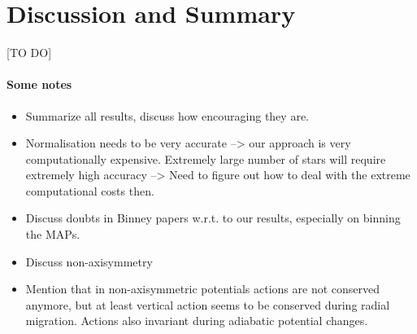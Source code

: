 \section{Discussion and Summary}

[TO DO]

\paragraph{Some notes}
\begin{itemize}
\item Summarize all results, discuss how encouraging they are.
\item Normalisation needs to be very accurate --> our approach is very computationally expensive. Extremely large number of stars will require extremely high accuracy --> Need to figure out how to deal with the extreme computational costs then.
\item Discuss doubts in Binney papers w.r.t. to our results, especially on binning the MAPs.
\item Discuss non-axisymmetry
\item Mention that in non-axisymmetric potentials actions are not conserved anymore, but at least vertical action seems to be conserved during radial migration. Actions also invariant during adiabatic potential changes.
\end{itemize}
